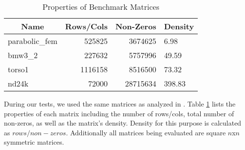 \begin{table}[]
	\centering
	\caption{Properties of Benchmark Matrices}
	\label{matrix-properties}
	\begin{tabular}{lrrl}
		\hline
		\multicolumn{1}{|c|}{\textbf{Name}} & \multicolumn{1}{c|}{\textbf{Rows/Cols}} & \multicolumn{1}{c|}{\textbf{Non-Zeros}} & \multicolumn{1}{l|}{\textbf{Density}} \\ \hline
		parabolic\_fem                      & 525825                             & 3674625                                 & 6.98                                   \\
		bmw3\_2                             & 227632                             & 5757996                                 & 49.59                                  \\
		torso1                              & 1116158                            & 8516500                                 & 73.32                                  \\
		nd24k                               & 72000                              & 28715634                                & 398.83                            
	\end{tabular}
\end{table}

During our tests, we used the same matrices as analyzed in \cite{techbib:6933066}. Table \ref{matrix-properties} lists the properties of each matrix including the number of rows/cols, total number of non-zeros, as well as the matrix's density. Density for this purpose is calculated as $rows / non-zeros$. Additionally all matrices being evaluated are square $n$x$n$ symmetric matrices. 


%	
%
%
%
%
%	

